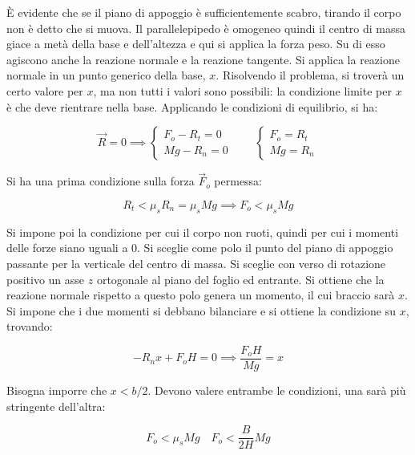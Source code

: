 \begin{figure}[htpb]
\end{figure}
\FloatBarrier
È evidente che se il piano di appoggio è sufficientemente scabro, tirando il corpo non è detto che si muova. Il parallelepipedo è omogeneo quindi il centro di massa giace a metà della base e dell'altezza e qui si applica la forza peso. Su di esso agiscono anche la reazione normale e la reazione tangente. Si applica la reazione normale in un punto generico della base, $x$.
Risolvendo il problema, si troverà un certo valore per $x$, ma non tutti i valori sono possibili: la condizione limite per $x$ è che deve rientrare nella base. Applicando le condizioni di equilibrio, si ha:

\[
	\vec{R} = 0 \implies \left\{ \begin{array}{l}
	 	F_o - R_t   = 0 \\
		Mg-R_n = 0
	\end{array} \right.
	\qquad
	\left\{ \begin{array}{l}
	 	F_o = R_t \\
		Mg = R_n
	\end{array} \right.
\]

Si ha una prima condizione sulla forza $\vec{F}_o$ permessa:

\[
	R_t < \mu_s R_n = \mu_s Mg \implies F_o < \mu_s Mg
\]

Si impone poi la condizione per cui il corpo non ruoti, quindi per cui i momenti delle forze siano uguali a $0$. Si sceglie come polo il punto del piano di appoggio passante per la verticale del centro di massa. Si sceglie con verso di rotazione positivo un asse $z$ ortogonale al piano del foglio ed entrante. Si ottiene che la reazione normale rispetto a questo polo genera un momento, il cui braccio sarà $x$. Si impone che i due momenti si debbano bilanciare e si ottiene la condizione su $x$, trovando:

\[
	-R_n x + F_o H = 0 \implies  \frac{F_o H}{Mg} = x
\]

Bisogna imporre che $x<b/2$. Devono valere entrambe le condizioni, una sarà più stringente dell'altra:

\[
	F_o < \mu_s Mg \quad F_o < \frac{B}{2H}Mg
\]

